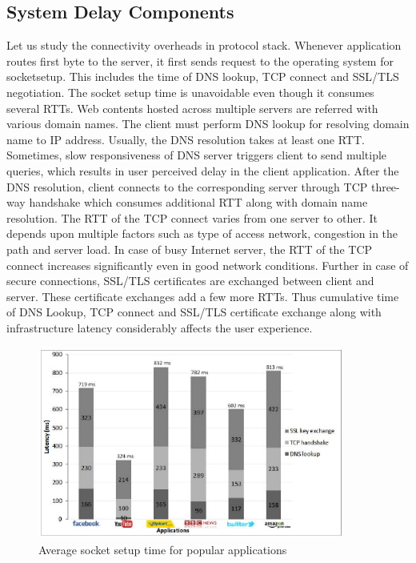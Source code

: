 \begin{multicols}{2}
\subsection{System Delay Components}

Let us study the connectivity overheads in protocol stack. Whenever application routes first byte to the server, it first sends request to the operating system for socketsetup. This includes the time of DNS lookup, TCP connect and SSL/TLS negotiation. The socket setup time is unavoidable even though it consumes several RTTs. Web contents hosted across multiple servers are referred with various domain names. The client must perform DNS lookup for resolving domain name to IP address. Usually, the DNS resolution takes at least one RTT. Sometimes, slow responsiveness of DNS server triggers client to send multiple queries, which results in user perceived delay in the client application. After the DNS resolution, client connects to the corresponding server through TCP three-way handshake which consumes additional RTT along with domain name resolution. The RTT of the TCP connect varies from one server to other. It depends upon multiple factors such as type of access network, congestion in the path and server load. In case of busy Internet server, the RTT of the TCP connect increases significantly even in good network conditions. Further in case of secure connections, SSL/TLS certificates are exchanged between client and server. These certificate exchanges add a few more RTTs. Thus cumulative time of DNS Lookup, TCP connect and SSL/TLS certificate exchange along with infrastructure latency considerably affects the user experience.

\begin{figure}[H]
\centering
\includegraphics[scale=2.7]{src/Figures/chap1/chap1-fig05.jpg}
\caption{Average socket setup time for popular applications}\label{chap1-fig05}
\end{figure}


\end{multicols}
